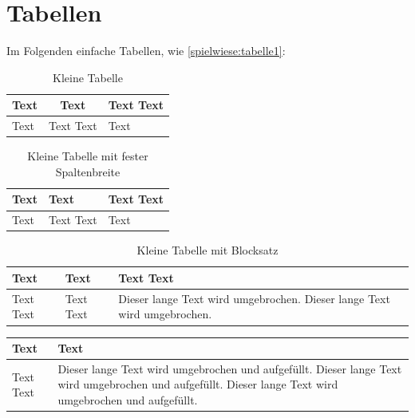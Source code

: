 \section{Tabellen}

Im Folgenden einfache Tabellen, wie \sczb \autoref{spielwiese:tabelle1}:

\begin{table}[!ht]
	\centering
	\caption{Kleine Tabelle}
	\label{spielwiese:tabelle1}
	\begin{tabular}{|l|c|l|} %
		\hline Text & Text & Text Text \\\hline
		Text & Text Text & Text \\\hline
	\end{tabular}
\end{table}

\begin{table}[!ht]
	\centering
	\caption{Kleine Tabelle mit fester Spaltenbreite}
	\label{spielwiese:tabelle2}
	\begin{tabular}{|l|C{3cm}|R{5cm}|} %
		\hline Text & Text & Text Text \\\hline
		Text & Text Text & Text \\\hline
	\end{tabular}
\end{table}

\begin{table}[!ht]
	\centering
	\caption{Kleine Tabelle mit Blocksatz}
	\label{spielwiese:tabelle3}
	\begin{tabular}{|l|L{3cm}|P{5cm}|} %
		\hline Text & Text & Text Text \\\hline
		Text Text & Text Text & Dieser lange Text wird umgebrochen. Dieser lange Text wird umgebrochen. \\\hline
	\end{tabular}
\end{table}

\begin{tabularx}{\textwidth}{|l|X|} %
	\caption{Tabelle mit aufgefüllter Spalte} \label{spielwiese:tabelle4} \\\hline \endhead
    \hline Text & Text \\ \hline
    Text Text & Dieser lange Text wird umgebrochen und aufgefüllt.
    Dieser lange Text wird umgebrochen und aufgefüllt.
    Dieser lange Text wird umgebrochen und aufgefüllt. \\ \hline
\end{tabularx}

